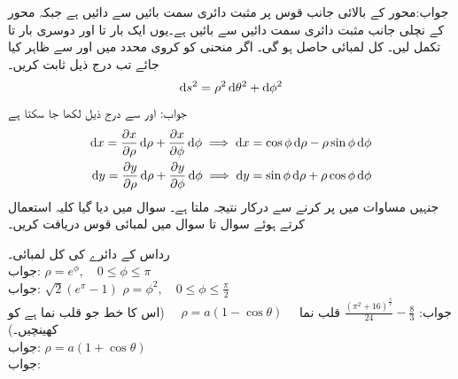 جواب:محور  کے بالائی جانب قوس پر مثبت دائری سمت بائیں سے دائیں ہے جبکہ محور کے نچلی جانب مثبت دائری سمت دائیں سے بائیں ہے۔یوں ایک بار  تا  اور دوسری بار  تا  تکمل لیں۔ کل لمبائی  حاصل ہو گی۔
\quad اگر منحنی کو کروی محدد میں  اور  سے ظاہر کیا جائے تب درج ذیل ثابت کریں۔
\begin{align*}
\dif s^2=\rho^2\dif \theta^2+\dif \phi^2
\end{align*}
جواب: اور  سے درج ذیل لکھا جا سکتا ہے
\begin{align*}
\dif x=\frac{\partial x}{\partial \rho}\dif \rho+\frac{\partial x}{\partial \phi}\dif \phi  \implies \dif x=\cos \phi \dif \rho-\rho\sin \phi\dif \phi\\
\dif y=\frac{\partial y}{\partial \rho}\dif \rho+\frac{\partial y}{\partial \phi}\dif \phi\implies \dif y=\sin \phi \dif \rho+\rho\cos \phi \dif \phi 
\end{align*}
جنہیں مساوات  میں پر کرنے سے درکار نتیجہ ملتا ہے۔
سوال  میں دیا گیا کلیہ استعمال کرتے ہوئے سوال  تا سوال  میں لمبائی قوس دریافت کریں۔

\quad رداس  کے دائرے کی کل لمبائی۔\\
جواب:
\quad
$\rho=e^{\phi},\quad 0\le \phi \le \pi$\\
جواب:
$\sqrt{2}(e^{\pi}-1)$
\quad
$\rho=\phi^2,\quad 0\le \phi \le \tfrac{\pi}{2}$\\
جواب:
$\tfrac{(\pi^2+16)^{\tfrac{3}{2}}}{24}-\tfrac{8}{3}$
\quad قلب نما 
$\quad \rho=a(1-\cos \theta)\quad $
(اس کا خط جو قلب نما ہے کو کھینچیں۔)\\
جواب:
\quad
$\rho=a(1+\cos \theta)$\\
جواب:

